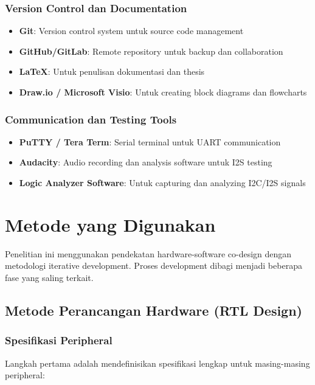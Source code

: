 \subsubsection{Version Control dan Documentation}

\begin{itemize}
	\item \textbf{Git}: Version control system untuk source code management
	\item \textbf{GitHub/GitLab}: Remote repository untuk backup dan collaboration
	\item \textbf{LaTeX}: Untuk penulisan dokumentasi dan thesis
	\item \textbf{Draw.io / Microsoft Visio}: Untuk creating block diagrams dan flowcharts
\end{itemize}

\subsubsection{Communication dan Testing Tools}

\begin{itemize}
	\item \textbf{PuTTY / Tera Term}: Serial terminal untuk UART communication
	\item \textbf{Audacity}: Audio recording dan analysis software untuk I2S testing
	\item \textbf{Logic Analyzer Software}: Untuk capturing dan analyzing I2C/I2S signals
\end{itemize}

\section{Metode yang Digunakan}

Penelitian ini menggunakan pendekatan hardware-software co-design dengan metodologi iterative development. Proses development dibagi menjadi beberapa fase yang saling terkait.

\subsection{Metode Perancangan Hardware (RTL Design)}

\subsubsection{Spesifikasi Peripheral}

Langkah pertama adalah mendefinisikan spesifikasi lengkap untuk masing-masing peripheral:

